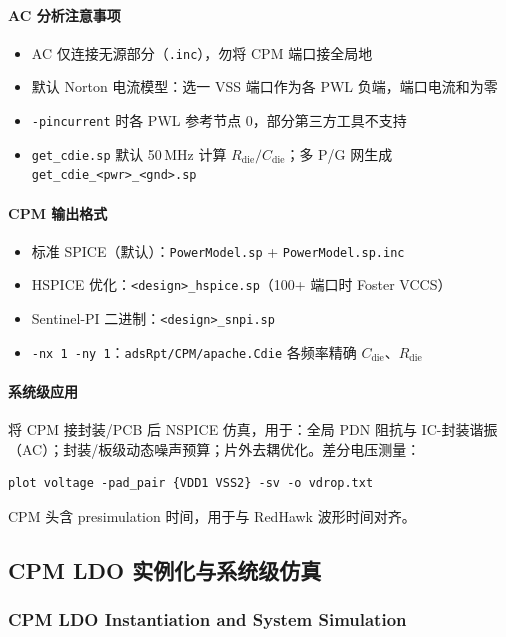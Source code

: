 \paragraph{AC 分析注意事项}
\begin{itemize}
  \item AC 仅连接无源部分（\texttt{.inc}），勿将 CPM 端口接全局地
  \item 默认 Norton 电流模型：选一 VSS 端口作为各 PWL 负端，端口电流和为零
  \item \texttt{-pincurrent} 时各 PWL 参考节点 0，部分第三方工具不支持
  \item \texttt{get\_cdie.sp} 默认 50\,MHz 计算 $R_{\mathrm{die}}/C_{\mathrm{die}}$；多 P/G 网生成 \texttt{get\_cdie\_<pwr>\_<gnd>.sp}
\end{itemize}

\paragraph{CPM 输出格式}
\begin{itemize}
  \item 标准 SPICE（默认）：\texttt{PowerModel.sp} + \texttt{PowerModel.sp.inc}
  \item HSPICE 优化：\texttt{<design>\_hspice.sp}（100+ 端口时 Foster VCCS）
  \item Sentinel-PI 二进制：\texttt{<design>\_snpi.sp}
  \item \texttt{-nx 1 -ny 1}：\texttt{adsRpt/CPM/apache.Cdie} 各频率精确 $C_{\mathrm{die}}$、$R_{\mathrm{die}}$
\end{itemize}

\paragraph{系统级应用}
将 CPM 接封装/PCB 后 NSPICE 仿真，用于：全局 PDN 阻抗与 IC-封装谐振（AC）；封装/板级动态噪声预算；片外去耦优化。差分电压测量：
\begin{lstlisting}
plot voltage -pad_pair {VDD1 VSS2} -sv -o vdrop.txt
\end{lstlisting}

CPM 头含 presimulation 时间，用于与 RedHawk 波形时间对齐。
\subsection{CPM LDO 实例化与系统级仿真}
\subsubsection*{CPM LDO Instantiation and System Simulation}

